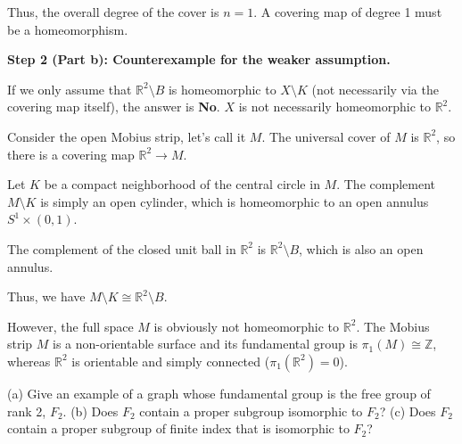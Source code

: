 \begin{solution}
Thus, the overall degree of the cover is $n = 1$. A covering map of degree 1 must be a homeomorphism.

\textbf{Step 2 (Part b): Counterexample for the weaker assumption.}

If we only assume that $\mathbb{R}^2 \setminus B$ is homeomorphic to $X \setminus K$ (not necessarily via the covering map itself), the answer is \textbf{No}. $X$ is not necessarily homeomorphic to $\mathbb{R}^2$.

Consider the open Mobius strip, let's call it $M$. The universal cover of $M$ is $\mathbb{R}^2$, so there is a covering map $\mathbb{R}^2 \to M$.

Let $K$ be a compact neighborhood of the central circle in $M$. The complement $M \setminus K$ is simply an open cylinder, which is homeomorphic to an open annulus $S^1 \times (0, 1)$.

The complement of the closed unit ball in $\mathbb{R}^2$ is $\mathbb{R}^2 \setminus B$, which is also an open annulus.

Thus, we have $M \setminus K \cong \mathbb{R}^2 \setminus B$.

However, the full space $M$ is obviously not homeomorphic to $\mathbb{R}^2$. The Mobius strip $M$ is a non-orientable surface and its fundamental group is $\pi_1(M) \cong \mathbb{Z}$, whereas $\mathbb{R}^2$ is orientable and simply connected ($\pi_1(\mathbb{R}^2) = 0$).
\end{solution}

\begin{exercise}
\label{geometry:2020:6}
(a) Give an example of a graph whose fundamental group is the free group of rank 2, $F_2$.
(b) Does $F_2$ contain a proper subgroup isomorphic to $F_2$?
(c) Does $F_2$ contain a proper subgroup of finite index that is isomorphic to $F_2$?
\end{exercise}

